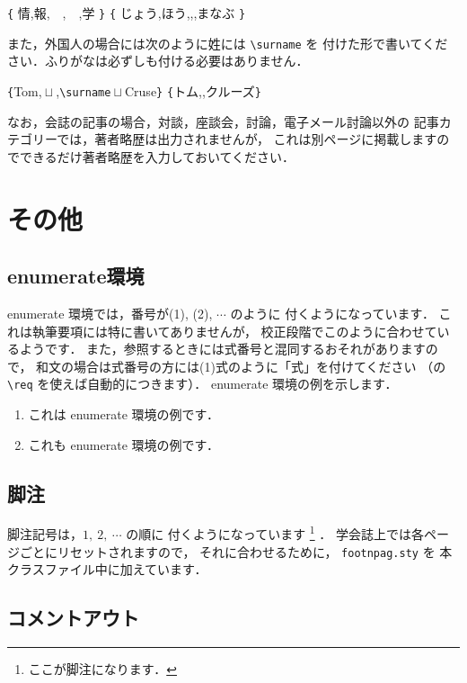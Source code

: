 \documentclass[J]{scitrans}
\begin{document}
\verb+{+ 情,報,　,　,学 \verb+}+ \verb+{+ じょう,ほう,,,まなぶ \verb+}+

また，外国人の場合には次のように姓には \verb+\surname+ を
付けた形で書いてください．ふりがなは必ずしも付ける必要はありません．


\verb+{+Tom,${}\sqcup$,\verb+\surname+${}\sqcup$Cruse\verb+}+ \verb+{+トム,,クルーズ\verb+}+

なお，会誌の記事の場合，対談，座談会，討論，電子メール討論以外の
記事カテゴリーでは，著者略歴は出力されませんが，
これは別ページに掲載しますのでできるだけ著者略歴を入力しておいてください． 

\section{その他}
\label{sec:miscellaneous}

\subsection{enumerate環境}
\label{subsec:enumerate}

enumerate 環境では，番号が(1), (2), $\cdots$ のように
付くようになっています．
これは執筆要項には特に書いてありませんが，
校正段階でこのように合わせているようです．
また，参照するときには式番号と混同するおそれがありますので，
和文の場合は式番号の方には(1)式のように「式」を付けてください
（{}の \verb+\req+ を使えば自動的につきます）．
enumerate 環境の例を示します．
%
\begin{enumerate}
\item これは enumerate 環境の例です．
\item これも enumerate 環境の例です．
\end{enumerate}
%


\subsection{脚注}
\label{subsec:footnote}

脚注記号は，$1,\ 2,\ \cdots$ の順に
付くようになっています%
\footnote{
  ここが脚注になります．
}%
．
学会誌上では各ページごとにリセットされますので，
それに合わせるために，
{\tt footnpag.sty} を 本クラスファイル中に加えています．

\subsection{コメントアウト}
\label{subsec:comment}
\end{document}
